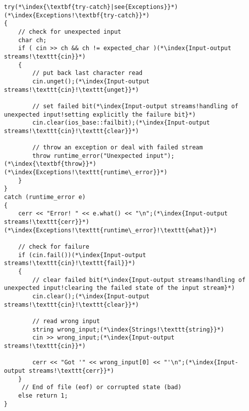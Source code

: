 \documentclass[10pt]{article}
\begin{document}
\begin{lstlisting}
try(*\index{\textbf{try-catch}|see{Exceptions}}*)(*\index{Exceptions!\textbf{try-catch}}*)
{
    // check for unexpected input
    char ch;
    if ( cin >> ch && ch != expected_char )(*\index{Input-output streams!\texttt{cin}}*)
    {
        // put back last character read
        cin.unget();(*\index{Input-output streams!\texttt{cin}!\texttt{unget}}*)
        
        // set failed bit(*\index{Input-output streams!handling of unexpected input!setting explicitly the failure bit}*)
        cin.clear(ios_base::failbit);(*\index{Input-output streams!\texttt{cin}!\texttt{clear}}*)
    
        // throw an exception or deal with failed stream
        throw runtime_error("Unexpected input");(*\index{\textbf{throw}}*)(*\index{Exceptions!\texttt{runtime\_error}}*)
    }
}
catch (runtime_error e)
{
    cerr << "Error! " << e.what() << "\n";(*\index{Input-output streams!\texttt{cerr}}*)(*\index{Exceptions!\texttt{runtime\_error}!\texttt{what}}*)
            
    // check for failure
    if (cin.fail())(*\index{Input-output streams!\texttt{cin}!\texttt{fail}}*)
    {
        // clear failed bit(*\index{Input-output streams!handling of unexpected input!clearing the failed state of the input stream}*)
        cin.clear();(*\index{Input-output streams!\texttt{cin}!\texttt{clear}}*)
                
        // read wrong input
        string wrong_input;(*\index{Strings!\texttt{string}}*)
        cin >> wrong_input;(*\index{Input-output streams!\texttt{cin}}*)
                    
        cerr << "Got '" << wrong_input[0] << "'\n";(*\index{Input-output streams!\texttt{cerr}}*)
    }
     // End of file (eof) or corrupted state (bad)
    else return 1;
}
\end{lstlisting}
%
%
\end{document}
